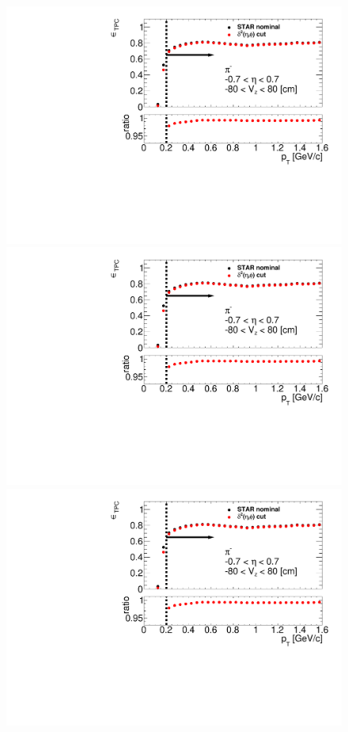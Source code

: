 \begin{figure}[ht]%
	\centering
	\parbox{0.48\textwidth}{
		\centering
		\includegraphics[width=\linewidth,page=1]{graphics/eff/tpcEffi.pdf}\\
		\includegraphics[width=\linewidth,page=2]{graphics/eff/tpcEffi.pdf}\\
		\includegraphics[width=\linewidth,page=3]{graphics/eff/tpcEffi.pdf}\\
}
\end{figure}
